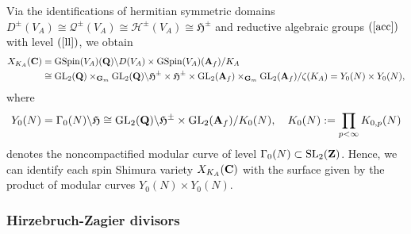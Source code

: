 \documentclass{amsart}
\theoremstyle{definition}
\theoremstyle{definition}
\theoremstyle{definition}
\begin{document}
Via the identifications of hermitian symmetric domains 
$D^{\pm}(V_A) \cong \mathcal{Q}^{\pm}(V_A) \cong \mathcal{H}^{\pm}(V_A) \cong \mathfrak{H}^{\pm}$
and reductive algebraic groups $(\ref{acc})$ with level $(\ref{ll})$, we obtain  
\begin{equation}\begin{aligned}\label{SSVid} X_{K_A}({\bf{C}}) 
&=  \operatorname{GSpin}(V_A)({\bf{Q}}) \backslash D(V_A) \times \operatorname{GSpin}(V_A)({\bf{A}}_f) /K_A \\
&\cong  \operatorname{GL}_2({\bf{Q}}) \times_{{\bf{G}}_m} \operatorname{GL}_2({\bf{Q}}) \backslash \mathfrak{H}^{\pm} \times \mathfrak{H}^{\pm} \times  \operatorname{GL}_2({\bf{A}}_f) \times_{{\bf{G}}_m} \operatorname{GL}_2({\bf{A}}_f) / \zeta(K_A) 
= Y_0(N) \times Y_0(N), \end{aligned}\end{equation} where  
\begin{align*} Y_0(N) = \Gamma_0(N) \backslash \mathfrak{H} 
\cong \operatorname{GL}_2({\bf{Q}}) \backslash \mathfrak{H}^{\pm} \times \operatorname{GL}_2({\bf{A}}_f) / K_0(N), \quad 
K_0(N) := \prod_{ p < \infty} K_{0, p}(N) \end{align*}
denotes the noncompactified modular curve of level $\Gamma_0(N) \subset \operatorname{SL}_2({\bf{Z}})$.
Hence, we can identify each spin Shimura variety $X_{K_A}({\bf{C}})$ with the surface 
given by the product of modular curves $Y_0(N) \times Y_0(N)$.

\subsubsection{Hirzebruch-Zagier divisors} 
\end{document}
